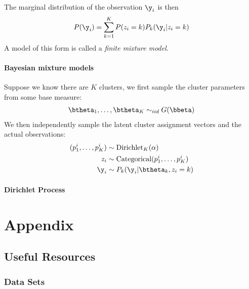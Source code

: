 \documentclass{book}
\begin{document}
The marginal distribution of the observation $\y_i$ is then
\begin{align}
P(\y_i) = \sum_{k=1}^K P(z_i = k) P_k(\y_i | z_i = k)
\end{align}
A model of this form is called a {\em{finite mixture model}}.

\subsection{Bayesian mixture models}
Suppose we know there are $K$ clusters, we first sample the cluster parameters from some base measure:
\begin{align}
\btheta_1, \dots, \btheta_K \sim_{iid} G(\bbeta)
\end{align}
We then independently sample the latent cluster assignment vectors and the actual observations:
\begin{align}
(p_1^i, \dots, p_K^i) &\sim \text{Dirichlet}_K(\alpha)\\
z_i &\sim \text{Categorical}(p_1^i, \dots, p_K^i)\\
\y_i &\sim P_k(\y_i | \btheta_k, z_i = k)
\end{align}

\subsection{Dirichlet Process}

\part{Appendix}


\chapter{Useful Resources}
\section{Data Sets}
\end{document}
